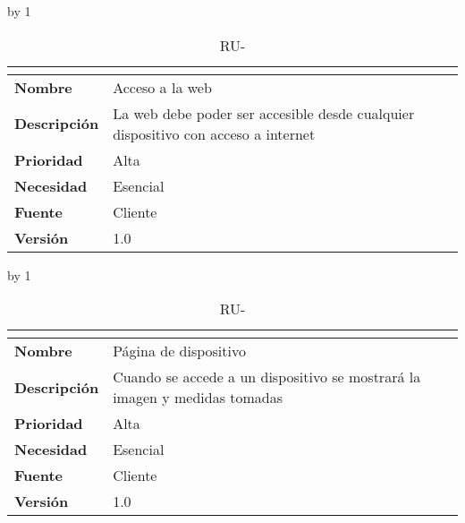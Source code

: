 \advance\ru by 1
\begin{table}[H]
	\caption{RU-\number\ru}
	\begin{tabular}{|l|p{}|}
		\hline
		\multicolumn{2}{|c|}{\cellcolor[HTML]{BFBFBF}{\color[HTML]{000000} \textbf{RU-\number\ru}}} \\ \hline
		\textbf{Nombre}      & Acceso a la web                                                                   \\ \hline
		\textbf{Descripción} & La web debe poder ser accesible desde cualquier dispositivo con acceso a internet \\ \hline
		\textbf{Prioridad}   & Alta                                                                              \\ \hline
		\textbf{Necesidad}   & Esencial                                                                          \\ \hline
		\textbf{Fuente}      & Cliente                                                                           \\ \hline
		\textbf{Versión}     & 1.0                                                                               \\ \hline
	\end{tabular}
\end{table}
\advance\ru by 1
\begin{table}[H]
	\caption{RU-\number\ru}
	\begin{tabular}{|l|p{}|}
		\hline
		\multicolumn{2}{|c|}{\cellcolor[HTML]{BFBFBF}{\color[HTML]{000000} \textbf{RU-\number\ru}}} \\ \hline
		\textbf{Nombre}      & Página de dispositivo                                                     \\ \hline
		\textbf{Descripción} & Cuando se accede a un dispositivo se mostrará la imagen y medidas tomadas \\ \hline
		\textbf{Prioridad}   & Alta                                                                      \\ \hline
		\textbf{Necesidad}   & Esencial                                                                  \\ \hline
		\textbf{Fuente}      & Cliente                                                                   \\ \hline
		\textbf{Versión}     & 1.0                                                                       \\ \hline
	\end{tabular}
\end{table}

